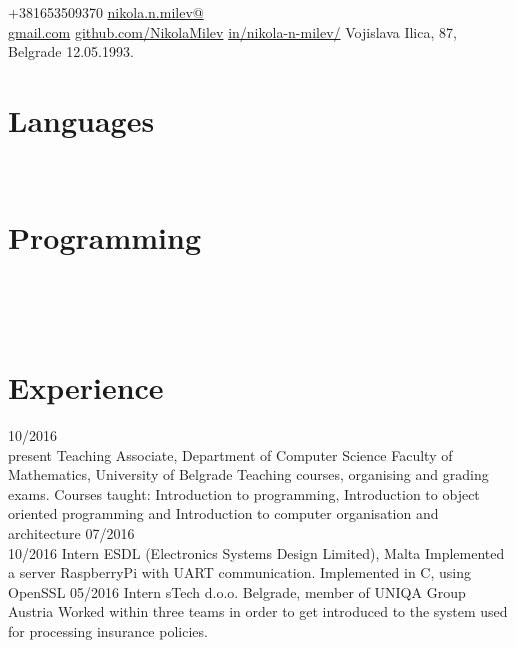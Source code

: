\documentclass{my_cv}
\begin{document}
\thispagestyle{empty}	
	{+381653509370}
 	{\href{mailto:nikola.n.milev@gmail.com}{nikola.n.milev@\\gmail.com}}
	{ \href{https://github.com/NikolaMilev}{github.com/NikolaMilev}} 	
 	{ \href{https://www.linkedin.com/in/nikola-n-milev/}{in/nikola-n-milev/}}
	{ Vojislava Ilica, 87, Belgrade }
	{12.05.1993.}


 
\begin{aside}
\section{Languages}
\bodyfont{}
~
~
\section{Programming}
~
\end {aside}
~
\section{Experience}
\begin{entrylist}
\entry
    {10/2016~\textemdash \\present}
    {Teaching Associate, Department of Computer Science}
    {Faculty of Mathematics, University of Belgrade}
    {Teaching courses, organising and grading exams. Courses taught: Introduction to programming, Introduction to object oriented programming and Introduction to computer organisation and architecture}
\entry
    {07/2016~\textemdash \\10/2016}
    {Intern}
    {ESDL (Electronics Systems Design Limited), Malta}
    {Implemented a server RaspberryPi with UART communication. Implemented in C, using OpenSSL}
\entry
    {05/2016}
    {Intern}
    {sTech d.o.o. Belgrade, member of UNIQA Group Austria}
    {Worked within three teams in order to get introduced to the system used for processing insurance policies. }
\end{entrylist}
\end{document}
